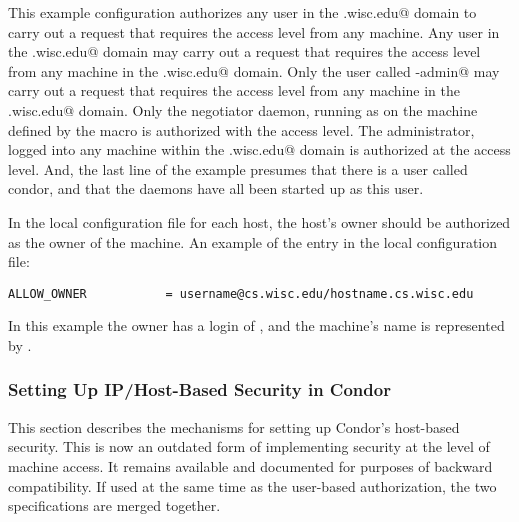 This example configuration authorizes
any user in the 
\verb@cs.wisc.edu@ domain to 
carry out a request that requires the 
 access level
from any machine.
Any user in the 
\verb@cs.wisc.edu@ domain may 
carry out a request that requires the 
 access level
from any machine in the
\verb@cs.wisc.edu@ domain.
Only the user called \verb@condor-admin@ may 
carry out a request that requires the 
 access level
from any machine in the
\verb@cs.wisc.edu@ domain.
Only the negotiator daemon, running as
\verb@condor@ on the machine defined by the
 macro is authorized 
with the
 access level.
The administrator, logged into any machine within
the \verb@cs.wisc.edu@ domain is authorized at the
 access level.
And, the last line of the example presumes that there is a
user called condor, and that the daemons have all been started
up as this user.

In the local configuration file for each host, the host's
owner should be authorized
as the owner of the machine.
An example of the entry in the local configuration file:
\footnotesize
\begin{verbatim}
ALLOW_OWNER           = username@cs.wisc.edu/hostname.cs.wisc.edu
\end{verbatim}
\normalsize
In this example the owner has a login of
\verb@username@, and the machine's name is represented by
\verb@hostname@.

\subsubsection{\label{sec:Host-Security}Setting Up IP/Host-Based Security in
Condor} 

This section describes the mechanisms for setting up Condor's
host-based security.  
This is now an outdated form of implementing security at
the level of machine access. 
It remains available and documented for purposes of backward compatibility.
If used at the same time as the user-based authorization,
the two specifications are merged together.

